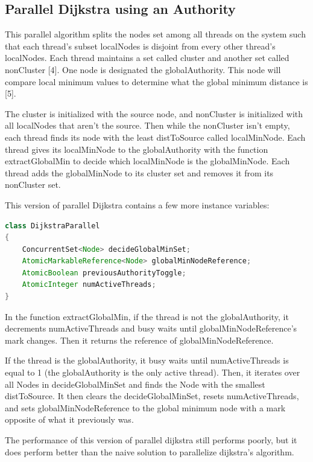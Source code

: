 \documentclass[letterpaper, 10 pt, conference]{ieeeconf}  %
\begin{document}
\subsection{Parallel Dijkstra using an Authority}

This parallel algorithm splits the nodes set among all threads on the system such that each thread’s subset localNodes is disjoint from every other thread’s localNodes. Each thread maintains a set called cluster and another set called nonCluster [4]. One node is designated the globalAuthority. This node will compare local minimum values to determine what the global minimum distance is [5].

The cluster is initialized with the source node, and nonCluster is initialized with all localNodes that aren’t the source. Then while the nonCluster isn’t empty, each thread finds its node with the least distToSource called localMinNode. Each thread gives its localMinNode to the globalAuthority with the function extractGlobalMin to decide which localMinNode is the globalMinNode. Each thread adds the globalMinNode to its cluster set and removes it from its nonCluster set. 

This version of parallel Dijkstra contains a few more instance variables:

\begin{lstlisting}[basicstyle=\scriptsize, language=Java]
class DijkstraParallel 
{
    ConcurrentSet<Node> decideGlobalMinSet;
    AtomicMarkableReference<Node> globalMinNodeReference;
    AtomicBoolean previousAuthorityToggle;
    AtomicInteger numActiveThreads;
}
\end{lstlisting}

In the function extractGlobalMin, if the thread is not the globalAuthority, it decrements numActiveThreads and busy waits until globalMinNodeReference’s mark changes. Then it returns the reference of globalMinNodeReference.

If the thread is the globalAuthority, it busy waits until numActiveThreads is equal to 1 (the globalAuthority is the only active thread). Then, it iterates over all Nodes in decideGlobalMinSet and finds the Node with the smallest distToSource. It then clears the decideGlobalMinSet, resets numActiveThreads, and sets globalMinNodeReference to the global minimum node with a mark opposite of what it previously was. 

The performance of this version of parallel dijkstra still performs poorly, but it does perform better than the naive solution to parallelize dijkstra’s algorithm. 
\end{document}
